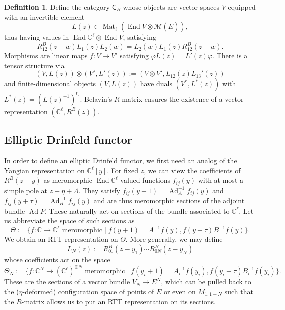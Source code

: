 \documentclass[11pt]{report}
\theoremstyle{definition}
\newtheorem{definition}[theorem]{Definition}
\theoremstyle{remark}
\theoremstyle{remark}
\newcommand{\C}{\mathbb{C}}
\begin{document}
\cite{article:etingof:1998}

\begin{definition}
Define the category $\mathsf{C}_B$ whose objects are vector spaces $V$ equipped with an invertible element
\begin{equation*}
L(z) \in \operatorname{Mat}_\ell(\operatorname{End} V \otimes \mathcal{M}(\bar E)),
\end{equation*}
thus having values in $\operatorname{End} \C^\ell \otimes \operatorname{End} V$, satisfying
\begin{equation*}
R_{12}^B(z-w) L_1(z) L_2(w) = L_2(w) L_1(z) R_{12}^B(z-w).
\end{equation*}
Morphisms are linear maps $f: V \to V'$ satisfying $\varphi L(z) = L'(z) \varphi$. There is a tensor structure via
\begin{equation*}
(V,L(z)) \otimes (V',L'(z)) := (V \otimes V', L_{12}(z) L_{13}'(z))
\end{equation*}
and finite-dimensional objects $(V,L(z))$ have duals $(V^*,L^*(z))$ with $L^*(z) = (L(z)^{-1})^{t_2}$. Belavin's $R$-matrix ensures the existence of a vector representation $(\C^\ell,R^B(z))$.
\end{definition}

\subsection{Elliptic Drinfeld functor}

In order to define an elliptic Drinfeld functor, we first need an analog of the Yangian representation on $\C^\ell[y]$. For fixed $z$, we can view the coefficients of $R^B(z-y)$ as meromorphic $\operatorname{End} \C^\ell$-valued functions $f_{ij}(y)$ with at most a simple pole at $z-\eta + \Lambda$. They satisfy $f_{ij}(y+1) = \operatorname{Ad}_A^{-1} f_{ij}(y)$ and $f_{ij}(y+\tau) = \operatorname{Ad}_B^{-1} f_{ij}(y)$ and are thus meromorphic sections of the adjoint bundle $\operatorname{Ad} P$. These naturally act on sections of the bundle associated to $\C^\ell$. Let us abbreviate the space of such sections as
\begin{equation*}
\Theta := \{ f: \C \to \C^\ell \text{ meromorphic} \mid f(y+1) = A^{-1} f(y), f(y+\tau) B^{-1} f(y) \}.
\end{equation*}
We obtain an RTT representation on $\Theta$. More generally, we may define
\begin{equation*}
L_N(z) := R_{01}^B(z-y_1) \cdots R_{0N}^B(z-y_N)
\end{equation*}
whose coefficients act on the space
\begin{equation*}
\Theta_N := \{ f: \C^N \to (\C^\ell)^{\otimes N} \text{ meromorphic} \mid f(y_i+1) = A_i^{-1} f(y_i), f(y_i+\tau) B_i^{-1} f(y_i) \}.
\end{equation*}
These are the sections of a vector bundle $V_N \to E^N$, which can be pulled back to the ($\eta$-deformed) configuration space of points of $E$ or even on $M_{1,1+N}$ such that the $R$-matrix allows us to put an RTT representation on its sections.
\end{document}
